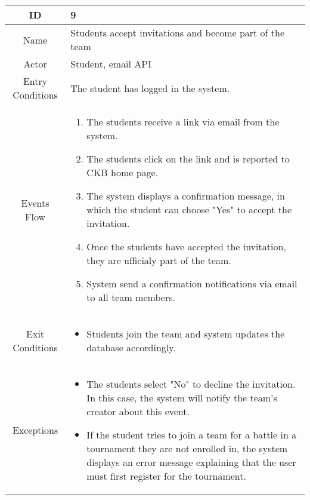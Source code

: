 \begin{longtable}{|c| p{10cm}|}
        \hline
            ID & 9 \\
        \hline
            Name & Students accept invitations and become part of the team \\
        \hline
            Actor & Student, email API \\
        \hline
            Entry Conditions & 

                                    The student  has logged in the system.
\\
        \hline
            Events Flow &   \begin{enumerate}
                
                                \item The students receive a link via email from the system.
                                \item  The students click on the link and is reported to CKB home page.
                                \item The system displays a confirmation message, in which the student can choose "Yes" to accept the invitation.
                                \item Once the students have accepted the invitation, they are ufficialy part of the team.
                                \item  System send a confirmation notifications via email to all team members.
                            \end{enumerate} \\
        \hline
            Exit Conditions &
            \begin{itemize}
                                    \item Students join the team and  system updates the database accordingly.
                                \end{itemize}\\
        \hline
            Exceptions & \begin{itemize}
                \item The students select "No" to decline the invitation. In this case, the system will notify the team's creator about this event.
                \item If the student tries to join a team for a battle in a tournament they are not enrolled in, the system displays an error message explaining that the user must first register for the tournament.
            \end{itemize} \\
        \hline
    \end{longtable}

